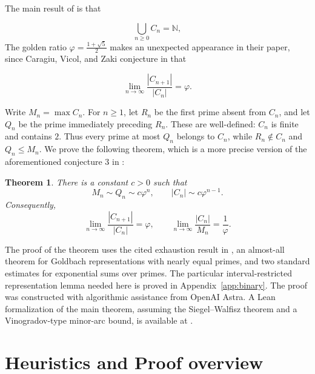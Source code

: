 \documentclass[11pt,letterpaper]{article}
\numberwithin{equation}{section}
\newtheorem{theorem}{Theorem}[section]
\theoremstyle{remark}
\newcommand{\N}{\mathbb N}
\newcommand{\ph}{\varphi}
\begin{document}
The main result of \cite{CVZ} is that

\begin{equation}\label{eq:exhaustion}
 \bigcup_{n\ge0}C_n=\N,
\end{equation}
%
The golden ratio $\ph=\frac{1+\sqrt5}{2}$ makes an unexpected appearance in their paper, since
Caragiu, Vicol, and Zaki  conjecture in \cite{CVZ} that

\begin{equation}\label{eq:conjecture}
 \lim_{n\to\infty}\frac{|C_{n+1}|}{|C_n|}
 =\ph.
\end{equation}



Write $M_n=\max C_n$. For $n\ge1$, let $R_n$ be the first prime absent
from $C_n$, and let $Q_n$ be the prime immediately preceding $R_n$.
These are well-defined: $C_n$ is finite and contains $2$. Thus every prime
at most $Q_n$ belongs to $C_n$, while $R_n\notin C_n$ and $Q_n\le M_n$.
We prove the following theorem, which is a more precise version of the aforementioned conjecture 3 in \cite{CVZ}:

\begin{theorem}\label{thm:main}
There is a constant $c>0$ such that
\begin{equation}\label{eq:main-scales}
 M_n\sim Q_n\sim c\ph^n,\qquad |C_n|\sim c\ph^{n-1}.
\end{equation}
Consequently,
\begin{equation}\label{eq:main-limits}
 \lim_{n\to\infty}\frac{|C_{n+1}|}{|C_n|}=\ph,
 \qquad
 \lim_{n\to\infty}\frac{|C_n|}{M_n}=\frac1\ph.
\end{equation}
\end{theorem}

The proof of the  theorem uses the cited exhaustion result in \cite{CVZ},
an almost-all theorem for Goldbach representations with nearly equal primes,
and two standard estimates for exponential sums over primes. The particular
interval-restricted representation lemma needed here is proved in
Appendix~\ref{app:binary}. The proof was constructed with algorithmic assistance from OpenAI Astra.
A Lean formalization of the main theorem, assuming the Siegel--Walfisz theorem and a Vinogradov-type minor-arc bound, is available at \cite{Github}.

\section{Heuristics and Proof overview}
\end{document}
